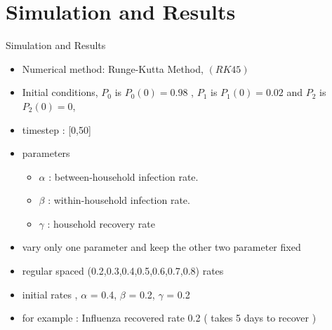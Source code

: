 \documentclass[smaller,aspectratio=169, toc=bibliography]{beamer}
\begin{document}
\section{Simulation and Results}
\begin{frame}[fragile]{Simulation and Results}
\begin{itemize}
\item Numerical method: Runge-Kutta Method, $(RK45)$ 
\item Initial conditions, $P_0$ is $P_0(0)= 0.98$ , $P_1$ is $P_1(0)=0.02$  and  $P_2$ is $P_2(0)=0$,
\item timestep : [0,50]
\item parameters
\begin{itemize}
	\item $\alpha$ : between-household infection rate. 
	\item $\beta$ : within-household infection rate. 
	\item $\gamma$ : household recovery rate
\end{itemize} 
\item vary only one parameter and keep the other two parameter fixed 
\item regular spaced (0.2,0.3,0.4,0.5,0.6,0.7,0.8) rates
\item initial rates , $\alpha$ = 0.4, $\beta$ = 0.2, $\gamma$ = 0.2 
\item for example : Influenza recovered rate 0.2 ( takes 5 days to recover )
\end{itemize}
\end{frame}

%
%
\end{document}
